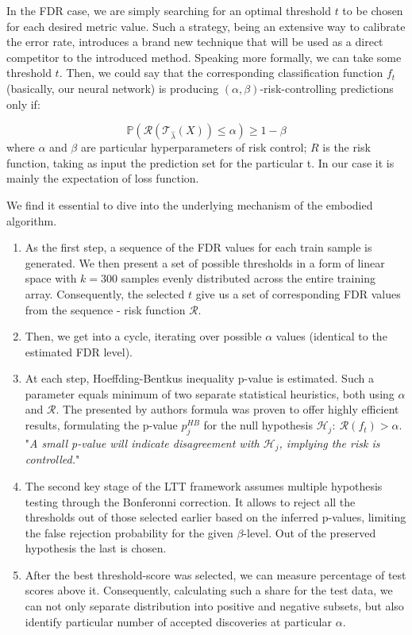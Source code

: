 \documentclass{article}
\begin{document}
In the FDR case, we are simply searching for an optimal threshold $t$ to be chosen for each desired metric value. Such a strategy, being an extensive way to calibrate the error rate, introduces a brand new technique that will be used as a direct competitor to the introduced method. Speaking more formally, we can take some threshold $t$. Then, we could say that the corresponding classification function $f_t$ (basically, our neural network) is producing $(\alpha, \beta)$-risk-controlling predictions only if:

\begin{equation}
        \mathbb{P}(\mathcal{R}(\mathcal{T}_{\hat{\lambda}}(X)) \leq \alpha) \geq 1 - \beta
\end{equation}
where $\alpha$ and $\beta$ are particular hyperparameters of risk control; $R$ is the risk function, taking as input the prediction set for the particular t. In our case it is mainly the expectation of loss function. 

We find it essential to dive into the underlying mechanism of the embodied algorithm.
\begin{enumerate}%
    \item As the first step, a sequence of the FDR values for each train sample is generated. We then present a set of possible thresholds in a form of linear space with $k=300$ samples evenly distributed across the entire training array. Consequently, the selected $t$ give us a set of corresponding FDR values from the sequence - risk function $\mathcal{R}$.
    \item Then, we get into a cycle, iterating over possible $\alpha$ values (identical to the estimated FDR level). 
    \item At each step, Hoeffding-Bentkus inequality p-value is estimated. Such a parameter equals minimum of two separate statistical heuristics, both using $\alpha$ and $\mathcal{R}$. The presented by authors formula was proven to offer highly efficient results, formulating the p-value $p_j^{HB}$ for the null hypothesis $\mathcal{H}_j: \ \mathcal{R}(f_t) > \alpha$. "\textit{A small p-value will indicate disagreement with $\mathcal{H}_j$, implying the risk is controlled.}" \cite{ltt}
    \item The second key stage of the LTT framework assumes multiple hypothesis testing through the Bonferonni correction. It allows to reject all the thresholds out of those selected earlier based on the inferred p-values, limiting the false rejection probability for the given $\beta$-level. Out of the preserved hypothesis the last is chosen.
    \item After the best threshold-score was selected, we can measure percentage of test scores above it. Consequently, calculating such a share for the test data, we can not only separate distribution into positive and negative subsets, but also identify particular number of accepted discoveries at particular $\alpha$.
\end{enumerate}
\end{document}
